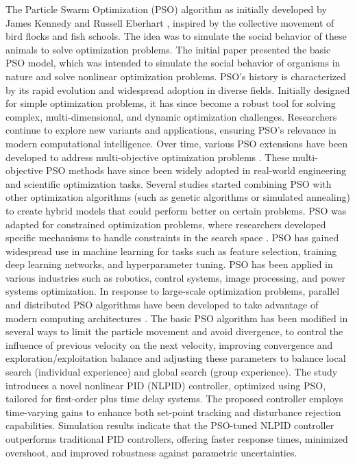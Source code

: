\documentclass[preprint,12pt]{elsarticle}
\begin{document}
The Particle Swarm Optimization (PSO) algorithm as initially developed by James Kennedy and Russell Eberhart \cite{eberhart1995particle,kennedy1997discrete,shi1998modified}, inspired by the collective movement of bird flocks and fish schools. The idea was to simulate the social behavior of these animals to solve optimization problems. The initial paper \cite{eberhart1995particle} presented the basic PSO model, which was intended to simulate the social behavior of organisms in nature and solve nonlinear optimization problems. PSO's history is characterized by its rapid evolution and widespread adoption in diverse fields. Initially designed for simple optimization problems, it has since become a robust tool for solving complex, multi-dimensional, and dynamic optimization challenges. Researchers continue to explore new variants and applications, ensuring PSO's relevance in modern computational intelligence. Over time, various PSO extensions have been developed to address multi-objective optimization problems \cite{coello2002mopso,deb2013evolutionary}. These multi-objective PSO methods have since been widely adopted in real-world engineering and scientific optimization tasks. Several studies started combining PSO with other optimization algorithms (such as genetic algorithms or simulated annealing) to create hybrid models that could perform better on certain problems. PSO was adapted for constrained optimization problems, where researchers developed specific mechanisms to handle constraints in the search space \cite{poli2007particle}. PSO has gained widespread use in machine learning for tasks such as feature selection, training deep learning networks, and hyperparameter tuning. PSO has been applied in various industries such as robotics, control systems, image processing, and power systems optimization. In response to large-scale optimization problems, parallel and distributed PSO algorithms have been developed to take advantage of modern computing architectures \cite{zhang2018comprehensive}. The basic PSO algorithm has been modified in several ways to limit the particle movement and avoid divergence, to control the influence of previous velocity on the next velocity, improving convergence and exploration/exploitation balance and adjusting these parameters to balance local search (individual experience) and global search (group experience). The study \cite{Charkoutsis2023} introduces a novel nonlinear PID (NLPID) controller, optimized using PSO, tailored for first-order plus time delay systems. The proposed controller employs time-varying gains to enhance both set-point tracking and disturbance rejection capabilities. Simulation results indicate that the PSO-tuned NLPID controller outperforms traditional PID controllers, offering faster response times, minimized overshoot, and improved robustness against parametric uncertainties. 
\end{document}
